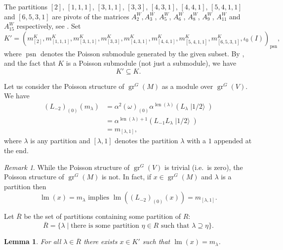 \documentclass[a4paper, 12pt, reqno]{amsart}
\newtheorem{lemma}[theorem]{Lemma}
\theoremstyle{remark}
\newtheorem{remark}[theorem]{Remark}
\DeclareMathOperator{\gr}{gr}
\DeclareMathOperator{\lm}{lm}
\DeclareMathOperator{\len}{len}
\DeclareMathOperator{\psn}{psn}
\DeclareMathOperator{\vachalf}{|1/2\rangle}
\begin{document}
The partitions $[2]$, $[1, 1, 1]$, $[3, 1, 1]$, $[3, 3]$, $[4, 3, 1]$, $[4, 4, 1]$, $[5, 4, 1, 1]$ and $[6, 5, 3, 1]$ are pivots of the matrices $A^W_2, A^W_3$, $A^W_5$, $A^W_6$, $A^W_8$, $A^W_9$, $A^W_{11}$ and $A^W_{15}$ respectively, see \cite[ising-modules.ipynb]{sagemath2}.
Set
\begin{equation*}
  K' = (m^K_{[2]}, m^K_{[1, 1, 1]}, m^K_{[3, 1, 1]}, m^K_{[3, 3]}, m^K_{[4, 3, 1]}, m^K_{[4, 4, 1]}, m^K_{[5, 4, 1, 1]}, m^K_{[6, 5, 3, 1]}, \iota_0(I))_{\psn},
\end{equation*}
where $\psn$ denotes the Poisson submodule generated by the given subset.
By ,  and the fact that $K$ is a Poisson submodule (not just a submodule), we have
\begin{equation*}
K' \subseteq K.
\end{equation*}

Let us consider the Poisson structure of $\gr^G(M)$ as a module over $\gr^G(V)$.
We have
\begin{align*}
  (L_{-2})_{(0)}(m_\lambda) &= \alpha^2(\omega)_{(0)}\alpha^{\len(\lambda)}(L_\lambda\vachalf) \\
  &= \alpha^{\len(\lambda) + 1}(L_{-1}L_\lambda\vachalf) \\
  &= m_{[\lambda, 1]},
\end{align*}
where $\lambda$ is any partition and $[\lambda, 1]$ denotes the partition $\lambda$ with a $1$ appended at the end.

\begin{remark}
  \label{rmk:7}
  While the Poisson structure of $\gr^G(V)$ is trivial (i.e.\ is zero), the Poisson structure of $\gr^G(M)$ is not.
  In fact, if $x \in \gr^G(M)$ and $\lambda$ is a partition then
  \begin{equation*}
    \lm(x) = m_\lambda\text{ implies }\lm((L_{-2})_{(0)}(x)) = m_{[\lambda, 1]}.
  \end{equation*}
\end{remark}

Let $\overline{R}$ be the set of partitions containing some partition of $R$:
\begin{equation*}
  \overline{R} = \{\lambda \mid \text{there is some partition }\eta \in R\text{ such that }\lambda \supseteq \eta\}.
\end{equation*}

\begin{lemma}
  \label{lmm:10}
  For all $\lambda \in \overline{R}$ there exists $x \in K'$ such that $\lm(x) = m_\lambda$.
\end{lemma}
\end{document}

